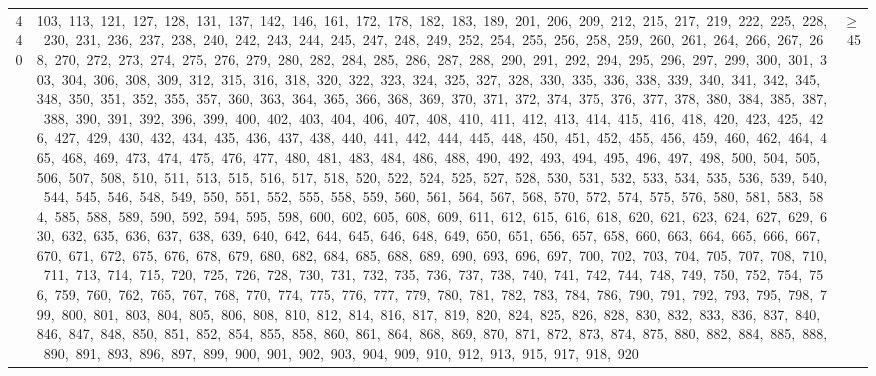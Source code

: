 \begin{longtable}{c|p{}|r}
440 & 103,\ 113,\ 121,\ 127,\ 128,\ 131,\ 137,\ 142,\ 146,\ 161,\ 172,\ 178,\ 182,\ 183,\ 189,\ 201,\ 206,\ 209,\ 212,\ 215,\ 217,\ 219,\ 222,\ 225,\ 228,\ 230,\ 231,\ 236,\ 237,\ 238,\ 240,\ 242,\ 243,\ 244,\ 245,\ 247,\ 248,\ 249,\ 252,\ 254,\ 255,\ 256,\ 258,\ 259,\ 260,\ 261,\ 264,\ 266,\ 267,\ 268,\ 270,\ 272,\ 273,\ 274,\ 275,\ 276,\ 279,\ 280,\ 282,\ 284,\ 285,\ 286,\ 287,\ 288,\ 290,\ 291,\ 292,\ 294,\ 295,\ 296,\ 297,\ 299,\ 300,\ 301,\ 303,\ 304,\ 306,\ 308,\ 309,\ 312,\ 315,\ 316,\ 318,\ 320,\ 322,\ 323,\ 324,\ 325,\ 327,\ 328,\ 330,\ 335,\ 336,\ 338,\ 339,\ 340,\ 341,\ 342,\ 345,\ 348,\ 350,\ 351,\ 352,\ 355,\ 357,\ 360,\ 363,\ 364,\ 365,\ 366,\ 368,\ 369,\ 370,\ 371,\ 372,\ 374,\ 375,\ 376,\ 377,\ 378,\ 380,\ 384,\ 385,\ 387,\ 388,\ 390,\ 391,\ 392,\ 396,\ 399,\ 400,\ 402,\ 403,\ 404,\ 406,\ 407,\ 408,\ 410,\ 411,\ 412,\ 413,\ 414,\ 415,\ 416,\ 418,\ 420,\ 423,\ 425,\ 426,\ 427,\ 429,\ 430,\ 432,\ 434,\ 435,\ 436,\ 437,\ 438,\ 440,\ 441,\ 442,\ 444,\ 445,\ 448,\ 450,\ 451,\ 452,\ 455,\ 456,\ 459,\ 460,\ 462,\ 464,\ 465,\ 468,\ 469,\ 473,\ 474,\ 475,\ 476,\ 477,\ 480,\ 481,\ 483,\ 484,\ 486,\ 488,\ 490,\ 492,\ 493,\ 494,\ 495,\ 496,\ 497,\ 498,\ 500,\ 504,\ 505,\ 506,\ 507,\ 508,\ 510,\ 511,\ 513,\ 515,\ 516,\ 517,\ 518,\ 520,\ 522,\ 524,\ 525,\ 527,\ 528,\ 530,\ 531,\ 532,\ 533,\ 534,\ 535,\ 536,\ 539,\ 540,\ 544,\ 545,\ 546,\ 548,\ 549,\ 550,\ 551,\ 552,\ 555,\ 558,\ 559,\ 560,\ 561,\ 564,\ 567,\ 568,\ 570,\ 572,\ 574,\ 575,\ 576,\ 580,\ 581,\ 583,\ 584,\ 585,\ 588,\ 589,\ 590,\ 592,\ 594,\ 595,\ 598,\ 600,\ 602,\ 605,\ 608,\ 609,\ 611,\ 612,\ 615,\ 616,\ 618,\ 620,\ 621,\ 623,\ 624,\ 627,\ 629,\ 630,\ 632,\ 635,\ 636,\ 637,\ 638,\ 639,\ 640,\ 642,\ 644,\ 645,\ 646,\ 648,\ 649,\ 650,\ 651,\ 656,\ 657,\ 658,\ 660,\ 663,\ 664,\ 665,\ 666,\ 667,\ 670,\ 671,\ 672,\ 675,\ 676,\ 678,\ 679,\ 680,\ 682,\ 684,\ 685,\ 688,\ 689,\ 690,\ 693,\ 696,\ 697,\ 700,\ 702,\ 703,\ 704,\ 705,\ 707,\ 708,\ 710,\ 711,\ 713,\ 714,\ 715,\ 720,\ 725,\ 726,\ 728,\ 730,\ 731,\ 732,\ 735,\ 736,\ 737,\ 738,\ 740,\ 741,\ 742,\ 744,\ 748,\ 749,\ 750,\ 752,\ 754,\ 756,\ 759,\ 760,\ 762,\ 765,\ 767,\ 768,\ 770,\ 774,\ 775,\ 776,\ 777,\ 779,\ 780,\ 781,\ 782,\ 783,\ 784,\ 786,\ 790,\ 791,\ 792,\ 793,\ 795,\ 798,\ 799,\ 800,\ 801,\ 803,\ 804,\ 805,\ 806,\ 808,\ 810,\ 812,\ 814,\ 816,\ 817,\ 819,\ 820,\ 824,\ 825,\ 826,\ 828,\ 830,\ 832,\ 833,\ 836,\ 837,\ 840,\ 846,\ 847,\ 848,\ 850,\ 851,\ 852,\ 854,\ 855,\ 858,\ 860,\ 861,\ 864,\ 868,\ 869,\ 870,\ 871,\ 872,\ 873,\ 874,\ 875,\ 880,\ 882,\ 884,\ 885,\ 888,\ 890,\ 891,\ 893,\ 896,\ 897,\ 899,\ 900,\ 901,\ 902,\ 903,\ 904,\ 909,\ 910,\ 912,\ 913,\ 915,\ 917,\ 918,\ 920 & $\ge$ 45 \\

\end{longtable}
